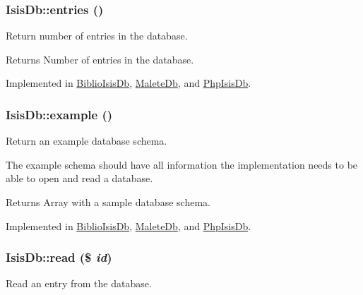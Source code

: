 \hypertarget{interfaceIsisDb_a86f38eca2b6d0835b60770d8a4e511ff}{
\subsubsection[{entries}]{\setlength{\rightskip}{0pt plus 5cm}IsisDb::entries ()}}
\label{interfaceIsisDb_a86f38eca2b6d0835b60770d8a4e511ff}
Return number of entries in the database.

\begin{DoxyReturn}{Returns}
Number of entries in the database. 
\end{DoxyReturn}


Implemented in \hyperlink{classBiblioIsisDb_ab6b0a977c066c25c6bdca5c1d3a083e8}{BiblioIsisDb}, \hyperlink{classMaleteDb_a5c6cb09a072e5d2ddce31c77098ccba4}{MaleteDb}, and \hyperlink{classPhpIsisDb_a0491ce84e5a85e775f811f18e63ef0fb}{PhpIsisDb}.

\hypertarget{interfaceIsisDb_a857c10d90da64067efa17afb2f32edb6}{
\subsubsection[{example}]{\setlength{\rightskip}{0pt plus 5cm}IsisDb::example ()}}
\label{interfaceIsisDb_a857c10d90da64067efa17afb2f32edb6}
Return an example database schema.

The example schema should have all information the implementation needs to be able to open and read a database.

\begin{DoxyReturn}{Returns}
Array with a sample database schema. 
\end{DoxyReturn}


Implemented in \hyperlink{classBiblioIsisDb_a8e76b289b9e3a9893b9469094753d2bc}{BiblioIsisDb}, \hyperlink{classMaleteDb_a4f16c48facae498d0db1a042e9727d04}{MaleteDb}, and \hyperlink{classPhpIsisDb_a7f4f3a9fd6dab86bd3cb3149d65f92cd}{PhpIsisDb}.

\hypertarget{interfaceIsisDb_a68335ec0db01ef03f0725621b38b5686}{
\subsubsection[{read}]{\setlength{\rightskip}{0pt plus 5cm}IsisDb::read (\$ {\em id})}}
\label{interfaceIsisDb_a68335ec0db01ef03f0725621b38b5686}
Read an entry from the database.


